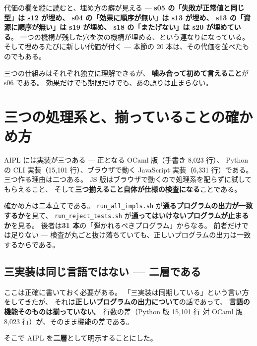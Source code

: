 \documentclass[11pt,a4paper]{ltjsarticle}
\theoremstyle{definition}
\theoremstyle{remark}
\begin{document}
代価の欄を縦に読むと、埋め方の癖が見える ---
\textbf{s05 の「失敗が正常値と同じ型」は s12 が埋め、
s04 の「効果に順序が無い」は s13 が埋め、
s13 の「資源に順序が無い」は s19 が埋め、
s18 の「またげない」は s20 が埋めている}。
一つの機構が残した穴を次の機構が埋める、という連なりになっている。
そして埋めるたびに新しい代価が付く ---
本節の 20 本は、その代価を並べたものでもある。

三つの仕組みはそれぞれ独立に理解できるが、
\textbf{噛み合って初めて言えること}が s06 である。
効果だけでも期限だけでも、あの誤りは止まらない。


\section{三つの処理系と、揃っていることの確かめ方}
\label{sec:impl}

AIPL には実装が三つある --- 正となる OCaml 版（手書き 8,023 行）、
Python の CLI 実装（15,101 行）、ブラウザで動く JavaScript 実装（6,331 行）である。
三つ作る理由は二つある。
JS 版はブラウザで動くので処理系を配らずに試してもらえること、
そして\textbf{三つ揃えること自体が仕様の検査になる}ことである。

確かめ方は二本立てである。
\texttt{run\_all\_impls.sh} が\textbf{通るプログラムの出力が一致するか}を見て、
\texttt{run\_reject\_tests.sh} が\textbf{通ってはいけないプログラムが止まるか}を見る。
後者は\textbf{31 本}の「弾かれるべきプログラム」からなる。
前者だけでは足りない ---
検査が丸ごと抜け落ちていても、正しいプログラムの出力は一致するからである。

\subsection{三実装は同じ言語ではない --- 二層である}
\label{sec:layers}

ここは正確に書いておく必要がある。
「三実装は同期している」という言い方をしてきたが、
それは\textbf{正しいプログラムの出力について}の話であって、
\textbf{言語の機能そのものは揃っていない}。
行数の差（Python 版 15,101 行 対 OCaml 版 8,023 行）が、そのまま機能の差である。

そこで AIPL を\textbf{二層}として明示することにした。
\end{document}
